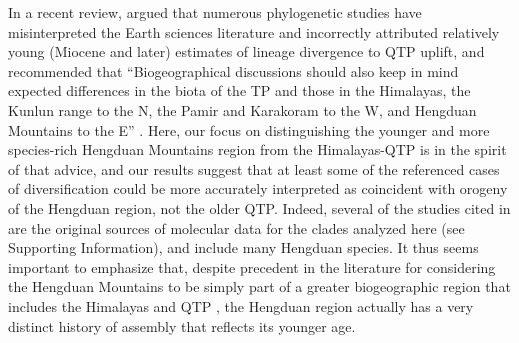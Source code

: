 In a recent review, \citet{Renner2016} argued that numerous phylogenetic studies have misinterpreted the Earth sciences literature and incorrectly attributed relatively young (Miocene and later) estimates of lineage divergence to QTP uplift, and recommended that ``Biogeographical discussions should also keep in mind expected differences in the biota of the TP and those in the Himalayas, the Kunlun range to the N, the Pamir and Karakoram to the W, and Hengduan Mountains to the E'' \citep[][p.~7]{Renner2016}. Here, our focus on distinguishing the younger and more species-rich Hengduan Mountains region from the Himalayas-QTP is in the spirit of that advice, and our results suggest that at least some of the referenced cases of diversification could be more accurately interpreted as coincident with orogeny of the Hengduan region, not the older QTP. Indeed, several of the studies cited in \citet{Renner2016} are the original sources of molecular data for the clades analyzed here (see Supporting Information), and include many Hengduan species. It thus seems important to emphasize that, despite precedent in the literature for considering the Hengduan Mountains to be simply part of a greater biogeographic region that includes the Himalayas and QTP \citep[e.g.][]{ZhangJ2014,Nie2013,GaoY2013,Matuszak2016}, the Hengduan region actually has a very distinct history of assembly that reflects its younger age.




